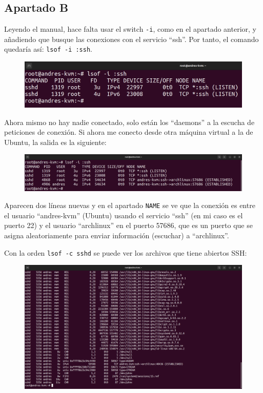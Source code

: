 \documentclass{article}
\begin{document}
\subsection*{Apartado B}
Leyendo el manual, hace falta usar el switch \verb|-i|, como en el apartado anterior, y añadiendo que busque las conexiones con el servicio ``ssh''. Por tanto, el comando quedaría así: \verb|lsof -i :ssh|.

\begin{figure}[H]
    \includegraphics[width=\textwidth]{imagenes/lsofisshlisten.png}
\end{figure}

Ahora mismo no hay nadie conectado, solo están los ``daemons'' a la escucha de peticiones de conexión. Si ahora me conecto desde otra máquina virtual a la de Ubuntu, la salida es la siguiente:

\begin{figure}[H]
    \includegraphics[width=\textwidth]{imagenes/lsofissharch.png}
\end{figure}

Aparecen dos líneas nuevas y en el apartado \verb|NAME| se ve que la conexión es entre el usuario ``andres-kvm'' (Ubuntu) usando el servicio ``ssh'' (en mi caso es el puerto 22)  y el usuario ``archlinux'' en el puerto 57686, que es un puerto que se asigna aleatoriamente para enviar información (escuchar) a ``archlinux''.

Con la orden \verb|lsof -c sshd| se puede ver los archivos que tiene abiertos SSH:

\begin{figure}[H]
    \includegraphics[width=\textwidth]{imagenes/lsofcsshd.png}
\end{figure}
\end{document}
